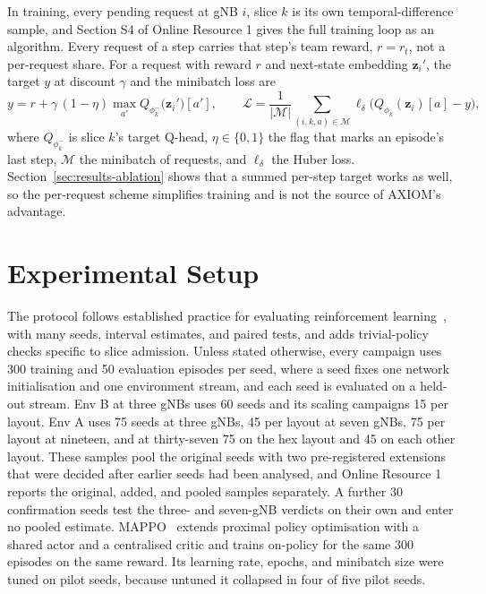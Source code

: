 \documentclass[pdflatex,sn-basic,Numbered]{sn-jnl}
\begin{document}
In training, every pending request at gNB $i$, slice $k$ is its own temporal-difference sample, and Section S4 of Online Resource 1 gives the full training loop as an algorithm. Every request of a step carries that step's team reward, $r=r_t$, not a per-request share. For a request with reward $r$ and next-state embedding $\mathbf{z}_i'$, the target $y$ at discount $\gamma$ and the minibatch loss are
\begin{equation}
y = r + \gamma\,(1-\eta)\max_{a'} Q_{\phi_k^-}\!\big(\mathbf{z}_i'\big)[a'],
\qquad
\mathcal{L} = \frac{1}{|\mathcal{M}|}\sum_{(i,k,a)\in \mathcal{M}}\ell_\delta\!\Big(Q_{\phi_k}(\mathbf{z}_i)[a]-y\Big),
\end{equation}
where $Q_{\phi_k^-}$ is slice $k$'s target Q-head, $\eta\in\{0,1\}$ the flag that marks an episode's last step, $\mathcal{M}$ the minibatch of requests, and $\ell_\delta$ the Huber loss. Section~\ref{sec:results-ablation} shows that a summed per-step target works as well, so the per-request scheme simplifies training and is not the source of AXIOM's advantage.

\section{Experimental Setup}
\label{sec:setup}
The protocol follows established practice for evaluating reinforcement learning~\cite{patterson2024empirical}, with many seeds, interval estimates, and paired tests, and adds trivial-policy checks specific to slice admission. Unless stated otherwise, every campaign uses 300 training and 50 evaluation episodes per seed, where a seed fixes one network initialisation and one environment stream, and each seed is evaluated on a held-out stream. Env B at three gNBs uses 60 seeds and its scaling campaigns 15 per layout. Env A uses 75 seeds at three gNBs, 45 per layout at seven gNBs, 75 per layout at nineteen, and at thirty-seven 75 on the hex layout and 45 on each other layout. These samples pool the original seeds with two pre-registered extensions that were decided after earlier seeds had been analysed, and Online Resource 1 reports the original, added, and pooled samples separately. A further 30 confirmation seeds test the three- and seven-gNB verdicts on their own and enter no pooled estimate. MAPPO~\cite{yu2022mappo} extends proximal policy optimisation with a shared actor and a centralised critic and trains on-policy for the same 300 episodes on the same reward. Its learning rate, epochs, and minibatch size were tuned on pilot seeds, because untuned it collapsed in four of five pilot seeds.
\end{document}
